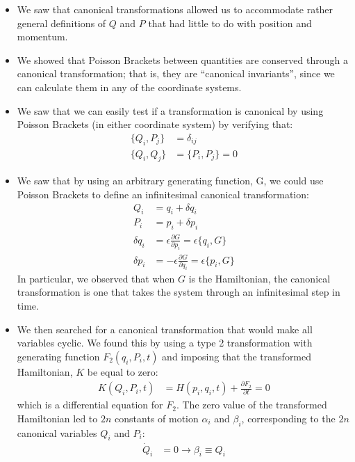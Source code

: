 \documentclass[10pt]{report}
\newcommand{\die}[2]{\frac{\partial #1}{\partial #2}}
\begin{document}
\begin{itemize}
\begin{align*}
p_i&=\die{}{q_i}F(q_i,Q_i,t)\nonumber\\
P_i&=-\die{}{Q_i}F(q_i,Q_i,t)\nonumber\\
K(Q_i,P_i,t)&=H(p_i,q_i,t)+\die{F}{t}
\end{align*}
\item We saw that canonical transformations allowed us to accommodate rather general definitions of $Q$ and $P$ that had little to do with position and momentum.
\item We showed that Poisson Brackets between quantities are conserved through a canonical transformation; that is, they are ``canonical invariants'', since we can calculate them in any of the coordinate systems.
\item We saw that we can easily test if a transformation is canonical by using Poisson Brackets (in either coordinate system) by verifying that:
\begin{align*}
\{Q_i,P_j\}&=\delta_{ij}\\
\{Q_i,Q_j\}&=\{P_i,P_j\}=0
\end{align*}
\item We saw that by using an arbitrary generating function, G, we could use Poisson Brackets to define an infinitesimal canonical transformation:
\begin{align*}
Q_i&=q_i+\delta q_i\\
P_i&=p_i+\delta p_i\\
\delta q_i&=\epsilon\die{G}{p_i}=\epsilon\{q_i,G\}\nonumber\\
\delta p_i&=-\epsilon\die{G}{q_i}=\epsilon\{p_i,G\}
\end{align*}
In particular, we observed that when $G$ is the Hamiltonian, the canonical transformation is one that takes the system through an infinitesimal step in time.
\item We then searched for a canonical transformation that would make all variables cyclic. We found this by using a type 2 transformation with generating function $F_2(q_i, P_i, t)$ and imposing that the transformed Hamiltonian, $K$ be equal to zero:
\begin{align*}
K(Q_i,P_i,t)&=H(p_i,q_i,t)+\die{F_2}{t}=0
\end{align*}
which is a differential equation for $F_2$. The zero value of the transformed Hamiltonian led to $2n$ constants of motion $\alpha_i$ and $\beta_i$, corresponding to the $2n$ canonical variables $Q_i$ and $P_i$:
\begin{align*}
\dot Q_i&=0 \rightarrow \beta_i\equiv Q_i\\

\end{align*}
\end{itemize}
\end{document}
